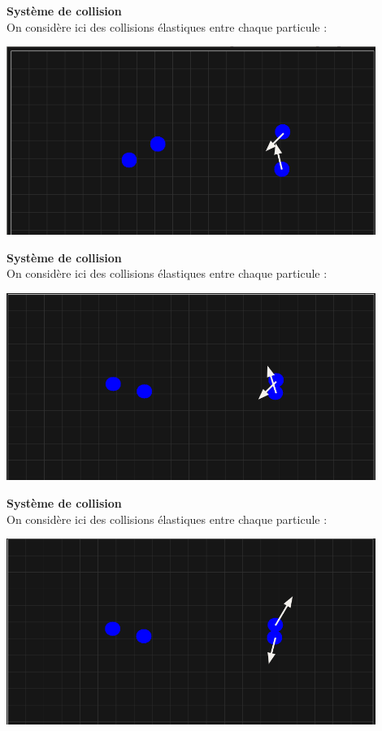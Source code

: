 \documentclass{article}
\begin{document}
\newpage
\vspace*{2pt}
\thispagestyle{landscape}
\textbf{Système de collision}
\\On considère ici des collisions élastiques entre chaque particule : 
\begin{center}
    \includegraphics[width=0.9\textwidth]{CollisionP2.png}
\end{center}

\newpage
\vspace*{2pt}
\thispagestyle{landscape}
\textbf{Système de collision}
\\[2ex]On considère ici des collisions élastiques entre chaque particule : 
\begin{center}
    \includegraphics[width=0.9\textwidth]{CollisionP3.png}
\end{center}

\newpage
\vspace*{2pt}
\thispagestyle{landscape}
\textbf{Système de collision}
\\On considère ici des collisions élastiques entre chaque particule : 
\begin{center}
    \includegraphics[width=0.9\textwidth]{CollisionP4.png}
\end{center}
\end{document}
